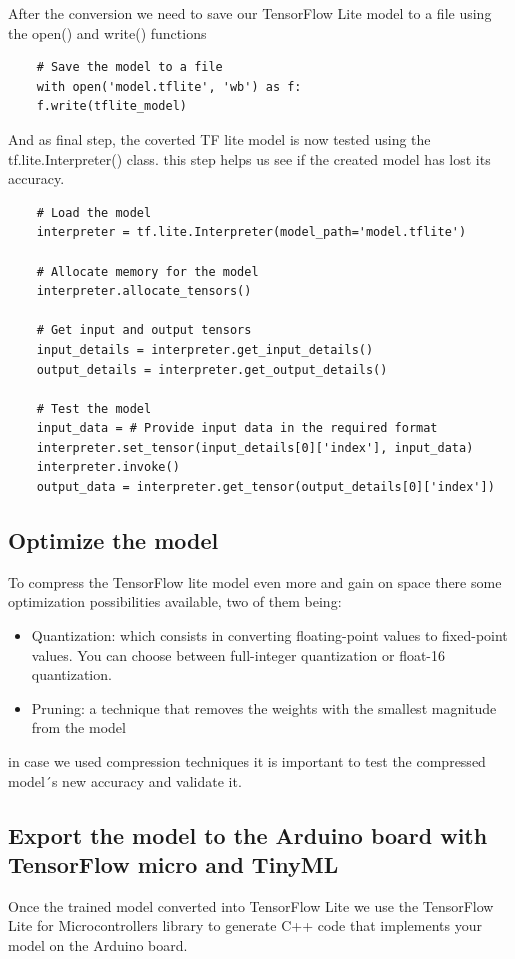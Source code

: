 After the conversion we need to save our TensorFlow Lite model to a file using the open() and write() functions
\begin{verbatim}
	# Save the model to a file
	with open('model.tflite', 'wb') as f:
	f.write(tflite_model)
\end{verbatim}

And as final step, the coverted TF lite model is now tested using the tf.lite.Interpreter() class. this step helps us see if the created model has lost its accuracy.
\begin{verbatim}
	# Load the model
	interpreter = tf.lite.Interpreter(model_path='model.tflite')
	
	# Allocate memory for the model
	interpreter.allocate_tensors()
	
	# Get input and output tensors
	input_details = interpreter.get_input_details()
	output_details = interpreter.get_output_details()
	
	# Test the model
	input_data = # Provide input data in the required format
	interpreter.set_tensor(input_details[0]['index'], input_data)
	interpreter.invoke()
	output_data = interpreter.get_tensor(output_details[0]['index'])
\end{verbatim}
\subsection{Optimize the model}
To compress the TensorFlow lite model even more and gain on space there some optimization possibilities available, two of them being: 
\begin{itemize}
\item Quantization: which consists in converting floating-point values to fixed-point values. You can choose between full-integer quantization or float-16 quantization.
\item Pruning: a technique that removes the weights with the smallest magnitude from the model

\end{itemize}
in case we used compression techniques it is important to test the compressed model´s new accuracy and validate it.

\subsection{Export the model to the Arduino board with TensorFlow micro and TinyML}

Once the trained model converted into TensorFlow Lite we use the TensorFlow Lite for Microcontrollers library to generate C++ code that implements your model on the Arduino board.

